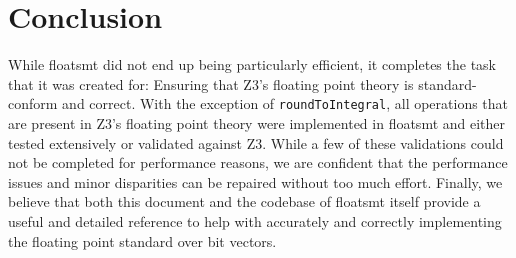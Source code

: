 \documentclass[a4paper,UKenglish,cleveref, autoref, thm-restate]{lipics-v2019}
\begin{document}
\section{Conclusion}
While floatsmt did not end up being particularly efficient, it completes the task that it was created for: Ensuring that Z3's floating point theory is standard-conform and correct. With the exception of \verb|roundToIntegral|, all operations that are present in Z3's floating point theory were implemented in floatsmt and either tested extensively or validated against Z3. While a few of these validations could not be completed for performance reasons, we are confident that the performance issues and minor disparities can be repaired without too much effort. Finally, we believe that both this document and the codebase of floatsmt itself provide a useful and detailed reference to help with accurately and correctly implementing the floating point standard over bit vectors.



\appendix
\end{document}
